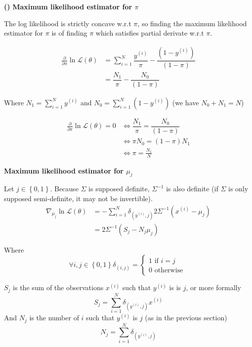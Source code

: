 \documentclass[a4paper, 11pt]{article}
\newcounter{cquestion}[subsection]
\renewcommand{\thecquestion}{\alph{cquestion}}
\newenvironment{question}
{\par \vspace{0.5em} \noindent \stepcounter{cquestion} \hspace{-1em}
 \textbf{(\thecquestion)}}
{}
\newcommand{\pd}[2]{\frac{\partial #1}{\partial #2}}
\newcommand{\wrt}{w.r.t }
\newcommand{\ipart}[1]{\vspace{0.5em}\textbf{#1}\vspace{0.5em}}
\begin{document}
\begin{question}
  \ipart{Maximum likelihood estimator for $\pi$}

  The log likelihood is strictly concave \wrt $\pi$, so finding the
  maximum likelihood estimator for $\pi$ is of finding $\pi$ which
  satisfies partial derivate \wrt $\pi$.

  \begin{align*}
    \pd{}{\pi}\ln{\mathcal{L}}(\theta) & = \sum_{i = 1}^N \dfrac{y^{(i)}}{\pi} - \dfrac{(1 - y^{(i)})}{(1 - \pi)} \\
    & = \dfrac{N_1}{\pi} - \dfrac{N_0}{(1 - \pi)}
  \end{align*}


  Where $N_1 = \sum_{i = 1}^N y^{(i)}$ and $N_0 = \sum_{i = 1}^N (1 - y^{(i)})$ (we have $N_0 + N_1 = N$)

  \begin{align*}
    \pd{}{\pi}\ln{\mathcal{L}}(\theta) = 0 & \Leftrightarrow \dfrac{N_1}{\pi} = \dfrac{N_0}{(1 - \pi)} \\
    & \Leftrightarrow \pi N_0 = (1 - \pi) N_1 \\
    & \Leftrightarrow \pi = \frac{N_1}{N}
  \end{align*}

  \ipart{Maximum likelihood estimator for $\mu_j$}

  Let $j \in \left\{0, 1\right\}$. Because $\Sigma$ is supposed
  definite, $\Sigma^{-1}$ is also definite (if $\Sigma$ is only
  supposed semi-definite, it may not be invertible).
  \begin{align*}
    \nabla_{\mu_j}{\ln{\mathcal{L}}}(\theta) & = - \sum_{i = 1}^N \delta_{(y^{(i)},j)} 2 \Sigma^{-1} (x^{(i)} - \mu_j) \\
    & = 2 \Sigma^{-1} (S_j - N_j \mu_j)
  \end{align*}

  Where
  \begin{equation*}
    \forall i, j \in \left\{0, 1\right\} \delta_{(i,j)} = \left\{
    \begin{array}{l}
      1 \text{ if } i = j \\
      0 \text{ otherwise }
    \end{array}
    \right.
  \end{equation*}

  $S_j$ is the sum of the observations $x^{(i)}$ such that $y^{(i)}$
  is is $j$, or more formally
  \begin{equation*}
    S_j = \sum_{i = 1}^N \delta_{(y^{(i)},j)} x^{(i)}
  \end{equation*}
  And $N_j$ is the number of $i$ such that $y^{(i)}$ is $j$ (as in the previous section)
  \begin{equation*}
    N_j = \sum_{i = 1}^N \delta_{(y^{(i)},j)}
  \end{equation*}


\end{question}
\end{document}
